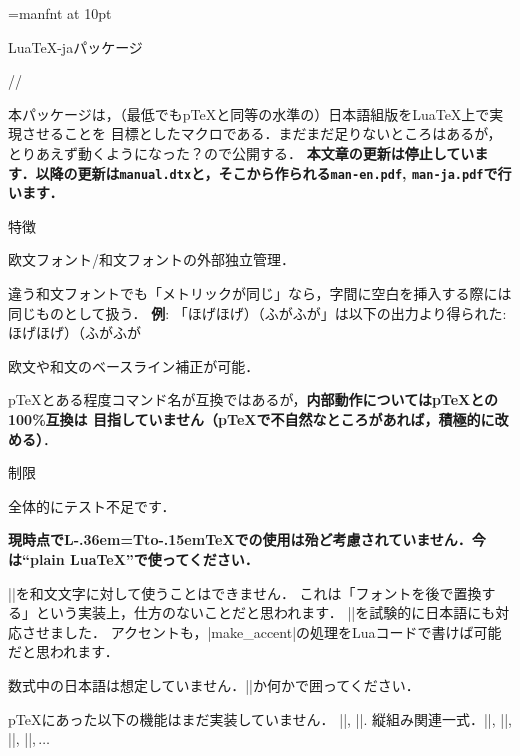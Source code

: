 
\overfullrule=0pt
\def\LaTeX{L\kern-.36em\setbox0=\hbox{T}\vbox to\ht0{\hbox{\sx A}\vss}\kern-.15em\TeX}
\font\mff=manfnt at 10pt
\def\mf{{\mff META{\rm\-}FONT}}
\def\textfontii{\the\textfont2 }
\def\AmS{{\textfontii A\kern-.1667em\lower.5ex\hbox{M}\kern-.125emS}}
\def\UPSILON{\char'7}%
\def\XyM{X\kern-.30em\smash{\raise.50ex\hbox{\UPSILON}}\kern-.30em{M}}%
\def\XyMTeX{\XyM\kern-.1em\TeX}%

\centerline{\big Lua\TeX-jaパッケージ}\bigskip
\centerline{\large\the\year/\the\month/\the\day}\medskip

\bigskip

本パッケージは，（最低でもp\TeX と同等の水準の）日本語組版をLua\TeX 上で実現させることを
目標としたマクロである．まだまだ足りないところはあるが，とりあえず動くようになった？ので公開する． 
{\bf 本文章の更新は停止しています．以降の更新は{\tt manual.dtx}と，そこから作られる{\tt man-en.pdf}, {\tt man-ja.pdf}で行います．}

\beginparagraph 特徴

\item 欧文フォント/和文フォントの外部独立管理．
\item 違う和文フォントでも「メトリックが同じ」なら，字間に空白を挿入する際には同じものとして扱う．
{\bf 例}: 「ほげほげ）{\gt （ふがふが}」は以下の出力より得られた:
\begintt
ほげほげ）{\gt （ふがふが}
\endtt
\item 欧文や和文のベースライン補正が可能．
\item p\TeX とある程度コマンド名が互換ではあるが，{\bf 内部動作についてはp\TeX との100\%互換は
目指していません{\small （p\TeX で不自然なところがあれば，積極的に改める）\inhibitglue}}．
\enditem

\beginparagraph 制限

\item 全体的にテスト不足です．
\item {\bf 現時点で\LaTeX での使用は殆ど考慮されていません．今は``plain Lua\TeX''で使ってください．}
\item |\accent|を和文文字に対して使うことはできません．
これは「フォントを後で置換する」という実装上，仕方のないことだと思われます．
{\small|\/|を試験的に日本語にも対応させました．
アクセントも，|make_accent|の処理をLuaコードで書けば可能だと思われます．}
\item 数式中の日本語は想定していません．|\hbox|か何かで囲ってください．
\item p\TeX にあった以下の機能はまだ実装していません．
\itemitem |\showmode|, |\jfam|.
\itemitem 縦組み関連一式．|\tate|, |\tfont|, |\tbaselineshift|, |\dtou|,$\,\ldots$


